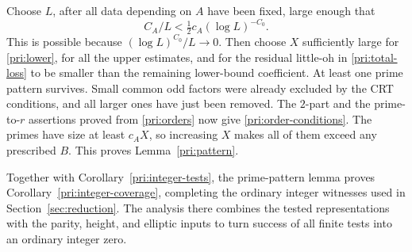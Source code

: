 Choose $L$, after all data depending on $A$ have been fixed, large
enough that
\[
                    C_A/L<\tfrac12 c_A(\log L)^{-C_0}.
\]
This is possible because $(\log L)^{C_0}/L\to0$.  Then choose $X$
sufficiently large for \eqref{pri:lower}, for all the upper estimates,
and for the residual little-oh in \eqref{pri:total-loss} to be smaller
than the remaining lower-bound coefficient.  At least one prime
pattern survives.  Small common odd factors were already excluded by
the CRT conditions, and all larger ones have just been removed.  The
$2$-part and the prime-to-$r$ assertions proved from
\eqref{pri:orders} now give \eqref{pri:order-conditions}.  The primes
have size at least $c_AX$, so increasing $X$ makes all of them exceed
any prescribed $B$.  This proves Lemma~\ref{pri:pattern}.

Together with Corollary~\ref{pri:integer-tests}, the prime-pattern lemma
proves Corollary~\ref{pri:integer-coverage}, completing the ordinary integer
witnesses used in Section~\ref{sec:reduction}.  The analysis there combines
the tested representations with the parity, height, and elliptic inputs to
turn success of all finite tests into an ordinary integer zero.
